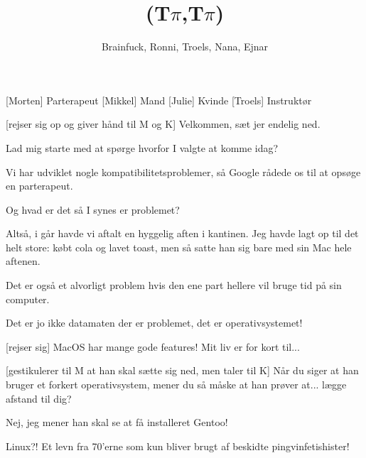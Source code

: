 \documentclass[a4paper,11pt]{article}
\title{(T$\pi$,T$\pi$)}
\author{Brainfuck, Ronni, Troels, Nana, Ejnar}
\begin{document}
\maketitle

\begin{roles}
  [Morten] Parterapeut
  [Mikkel] Mand
  [Julie] Kvinde
  [Troels] Instruktør
\end{roles}

\begin{props}
\end{props}

\begin{sketch}

  [rejser sig op og giver hånd til M og K] Velkommen, sæt jer
  endelig ned.


   Lad mig starte med at spørge hvorfor I valgte at komme idag?

   Vi har udviklet nogle kompatibilitetsproblemer, så Google
  rådede os til at opsøge en parterapeut.

   Og hvad er det så I synes er problemet?

   Altså, i går havde vi aftalt en hyggelig aften i kantinen.  Jeg
  havde lagt op til det helt store: købt cola og lavet toast, men så
  satte han sig bare med sin Mac hele aftenen.

   Det er også et alvorligt problem hvis den ene part hellere vil
  bruge tid på sin computer.


   Det er jo ikke datamaten der er problemet, det er operativsystemet!

  [rejser sig] MacOS har mange gode features!  Mit liv er for kort til...

  [gestikulerer til M at han skal sætte sig ned, men taler
    til K] Når du siger at han bruger et forkert operativsystem, mener
  du så måske at han prøver at... lægge afstand til dig?

   Nej, jeg mener han skal se at få installeret Gentoo!

   Linux?!  Et levn fra 70'erne som kun bliver brugt af beskidte
  pingvinfetishister!


\end{sketch}
\end{document}
